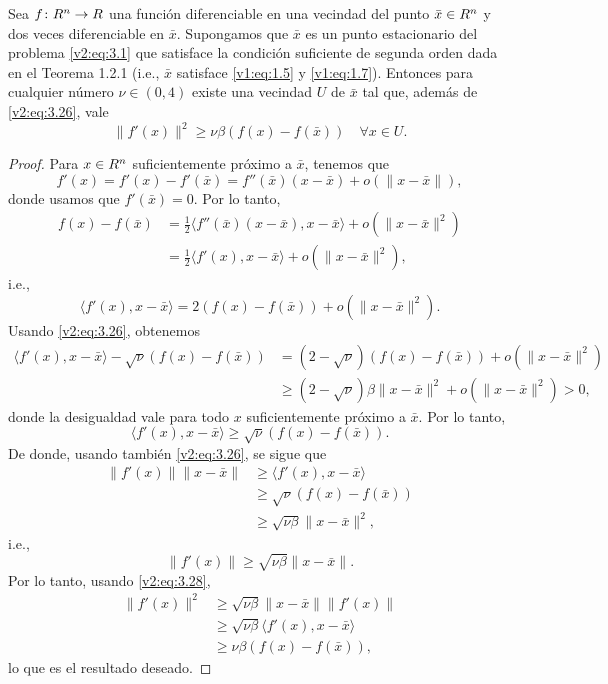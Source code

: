 \begin{lemma}\label{v2:lem:3.1.5}
    Sea $f \colon R^n \to R$ una función diferenciable en una vecindad del punto $\bar{x} \in R^n$ y dos veces diferenciable en $\bar{x}$. Supongamos que $\bar{x}$ es un punto estacionario del problema \eqref{v2:eq:3.1} que satisface la condición suficiente de segunda orden dada en el Teorema 1.2.1 (i.e., $\bar{x}$ satisface \eqref{v1:eq:1.5} y \eqref{v1:eq:1.7}).
    Entonces para cualquier número $\nu \in (0, 4)$ existe una vecindad $U$ de $\bar{x}$ tal que, además de \eqref{v2:eq:3.26}, vale
    \begin{equation}
        \|f'(x)\|^2 \ge \nu \beta (f(x) - f(\bar{x})) \quad \forall x \in U.
        \label{v2:eq:3.27}
    \end{equation}
\end{lemma}
\begin{proof}
    Para $x \in R^n$ suficientemente próximo a $\bar{x}$, tenemos que
    \[
        f'(x) = f'(x) - f'(\bar{x}) = f''(\bar{x})(x - \bar{x}) + o(\|x - \bar{x}\|),
    \]
    donde usamos que $f'(\bar{x}) = 0$. Por lo tanto,
    \begin{align*}
        f(x) - f(\bar{x}) &= \frac{1}{2} \langle f''(\bar{x})(x - \bar{x}), x - \bar{x} \rangle + o(\|x - \bar{x}\|^2) \\
        &= \frac{1}{2} \langle f'(x), x - \bar{x} \rangle + o(\|x - \bar{x}\|^2),
    \end{align*}
    i.e.,
    \[
        \langle f'(x), x - \bar{x} \rangle = 2(f(x) - f(\bar{x})) + o(\|x - \bar{x}\|^2).
    \]
    Usando \eqref{v2:eq:3.26}, obtenemos
    \begin{align*}
        \langle f'(x), x - \bar{x} \rangle - \sqrt{\nu}(f(x) - f(\bar{x})) &= (2 - \sqrt{\nu})(f(x) - f(\bar{x})) + o(\|x - \bar{x}\|^2) \\
        &\ge (2 - \sqrt{\nu})\beta\|x - \bar{x}\|^2 + o(\|x - \bar{x}\|^2) > 0,
    \end{align*}
    donde la desigualdad vale para todo $x$ suficientemente próximo a $\bar{x}$. Por lo tanto,
    \begin{equation}
        \langle f'(x), x - \bar{x} \rangle \ge \sqrt{\nu}(f(x) - f(\bar{x})).
        \label{v2:eq:3.28}
    \end{equation}
    De donde, usando también \eqref{v2:eq:3.26}, se sigue que
    \begin{align*}
        \|f'(x)\|\|x - \bar{x}\| &\ge \langle f'(x), x - \bar{x} \rangle \\
        &\ge \sqrt{\nu}(f(x) - f(\bar{x})) \\
        &\ge \sqrt{\nu\beta}\|x - \bar{x}\|^2,
    \end{align*}
    i.e.,
    \[
        \|f'(x)\| \ge \sqrt{\nu\beta}\|x - \bar{x}\|.
    \]
    Por lo tanto, usando \eqref{v2:eq:3.28},
    \begin{align*}
        \|f'(x)\|^2 &\ge \sqrt{\nu\beta}\|x - \bar{x}\| \|f'(x)\| \\
        &\ge \sqrt{\nu\beta}\langle f'(x), x - \bar{x} \rangle \\
        &\ge \nu\beta(f(x) - f(\bar{x})),
    \end{align*}
    lo que es el resultado deseado.
\end{proof}

